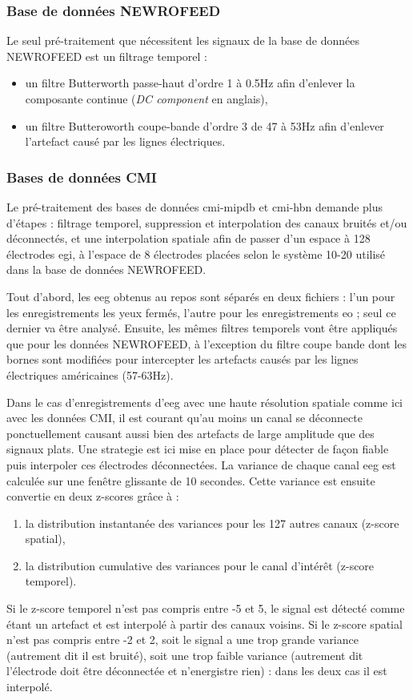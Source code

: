 \subsubsection{Base de données NEWROFEED}
Le seul pré-traitement que nécessitent les signaux de la base de données NEWROFEED est un filtrage temporel : 
\begin{itemize}
\item un filtre Butterworth passe-haut d'ordre 1 à 0.5Hz afin d'enlever la composante continue (\textit{DC component} en anglais),
\item un filtre Butteroworth coupe-bande d'ordre 3 de 47 à 53Hz afin d'enlever l'artefact causé par les lignes électriques.
\end{itemize}

\subsubsection{Bases de données CMI}

Le pré-traitement des bases de données \gls{cmi-mipdb} et \gls{cmi-hbn} demande plus d'étapes : filtrage temporel, suppression et 
interpolation des canaux bruités et/ou déconnectés, et une interpolation spatiale afin de passer d'un espace à 128 électrodes \gls{egi},
à l'espace de 8 électrodes placées selon le système 10-20 utilisé dans la base de données NEWROFEED.

Tout d'abord, les \gls{eeg} obtenus au repos sont séparés en deux fichiers : l'un pour les enregistrements les yeux fermés, 
l'autre pour les enregistrements \gls{eo} ; seul ce dernier va être analysé. Ensuite, les mêmes filtres temporels vont être appliqués
que pour les données NEWROFEED, à l'exception du filtre coupe bande dont les bornes sont modifiées pour intercepter les artefacts 
causés par les lignes électriques américaines (57-63Hz).

Dans le cas d'enregistrements d'\gls{eeg} avec une haute résolution spatiale comme ici avec les données CMI, 
il est courant qu'au moins un canal se déconnecte ponctuellement causant aussi bien des artefacts de large amplitude que des signaux plats. 
Une strategie est ici mise en place pour détecter de façon fiable puis interpoler ces électrodes déconnectées. La variance de chaque canal 
\gls{eeg} est calculée sur une fenêtre glissante de 10 secondes. Cette variance est ensuite convertie en deux z-scores grâce à :
\begin{enumerate}
\item la distribution instantanée des variances pour les 127 autres canaux (z-score spatial),
\item la distribution cumulative des variances pour le canal d'intérêt (z-score temporel).
\end{enumerate}
Si le z-score temporel n'est pas compris entre -5 et 5, le signal est détecté comme étant un artefact et est interpolé à partir des canaux voisins.
Si le z-score spatial n'est pas compris entre -2 et 2, soit le signal a une trop grande variance (autrement dit il est bruité), soit une trop faible
variance (autrement dit l'électrode doit être déconnectée et n'energistre rien) : dans les deux cas il est interpolé.

